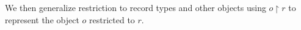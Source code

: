 


We then generalize restriction to record types and other objects using
$o\!\restriction\!r$ to represent the object $o$ restricted to $r$.


